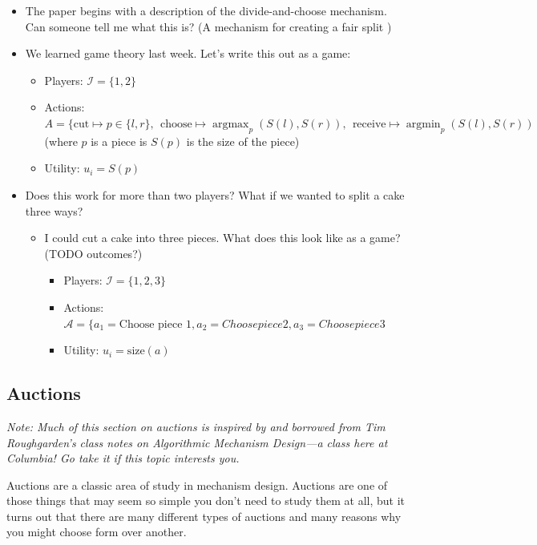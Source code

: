 \documentclass[11pt]{article}
\begin{document}
\begin{itemize}
    \item The paper begins with a description of the divide-and-choose mechanism. Can someone tell me what this is? (A mechanism for creating a fair split )
    \item We learned game theory last week. Let's write this out as a game:
    \begin{itemize}
        \item Players: $\mathcal{I} = \{1,2\}$
        \item Actions: $A = \{\text{cut} \mapsto p \in \{l,r\},~~\text{choose} \mapsto \operatorname*{argmax}_p (S(l), S(r)),~~\text{receive} \mapsto \operatorname*{argmin}_p (S(l), S(r))$ (where $p$ is a piece is $S(p)$ is the size of the piece)
        \item Utility: $u_i = S(p)$
    \end{itemize}
    \item Does this work for more than two players? What if we wanted to split a cake three ways?
    \begin{itemize}
        \item I could cut a cake into three pieces. What does this look like as a game? (TODO outcomes?)
        \begin{itemize}
            \item Players: $\mathcal{I} = \{1,2,3\}$
            \item Actions: $\mathcal{A} = \{a_1 = \text{Choose piece 1}, a_2 = {Choose piece 2}, a_3 = {Choose piece 3}$
            \item Utility: $u_i = \text{size}(a)$
        \end{itemize}
    \end{itemize}
\end{itemize}

\subsection{Auctions}

{\it Note: Much of this section on auctions is inspired by and borrowed from Tim Roughgarden's class notes on Algorithmic Mechanism Design---a class here at Columbia! Go take it if this topic interests you.}

Auctions are a classic area of study in mechanism design.
Auctions are one of those things that may seem so simple you don't need to study them at all, but it turns out that there are many different types of auctions and many reasons why you might choose form over another.
\end{document}
